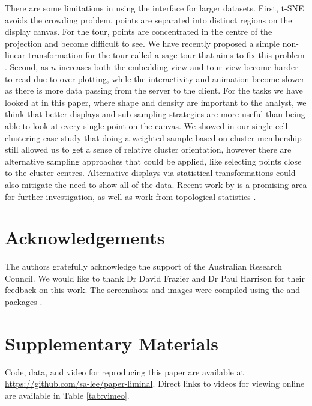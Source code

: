 \documentclass[article,notitle]{jdssv}
\begin{document}
There are some limitations
in using the  interface for larger datasets. First,
t-SNE avoids the crowding problem, points are separated into distinct regions
on the display canvas. For the tour, points are concentrated in the
centre of the projection and become difficult to see. We have recently proposed a simple non-linear transformation for the tour called a sage tour that aims to fix this problem \citep{Laa2020-vk}.
Second, as \(n\) increases both the embedding view and tour view become harder to read due to over-plotting, while the interactivity and animation become slower as there is more data passing from the server to the client.
For the tasks we have looked at in this paper, where shape and density are important to the analyst, we think that better displays and sub-sampling strategies are more useful than being able to look at every single point on the canvas. We showed in our single cell clustering case study that doing a weighted sample based on cluster membership still allowed us to get a sense of relative cluster orientation, however there are alternative sampling approaches that could be applied, like selecting points close to the cluster centres. Alternative displays via statistical transformations could also mitigate the need to show all of the data. Recent work
by \citet{Laa2020-wr} is a promising area for further investigation, as well as
work from topological statistics \citep{Rieck2017-kk, Genovese2017-iq}.

\hypertarget{acknowledgements}{%
\section*{Acknowledgements}\label{acknowledgements}}

The authors gratefully acknowledge the support of the Australian Research Council.
We would like to thank Dr David Frazier and Dr Paul Harrison for
their feedback on this work. The screenshots and images were compiled using the
 and  packages \citep{r-cowplot, Wickham2016-gz}.

\hypertarget{supplementary-materials}{%
\section*{Supplementary Materials}\label{supplementary-materials}}

Code, data, and video for reproducing this paper are available at \url{https://github.com/sa-lee/paper-liminal}. Direct links to videos for viewing
online are available in Table \ref{tab:vimeo}.
\end{document}
